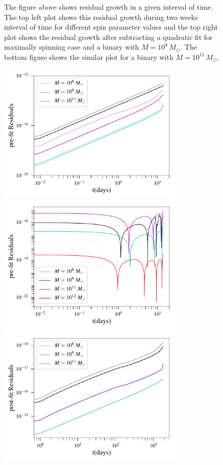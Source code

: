 \documentclass[twocolumn,showpacs,aps,prd,nobibnotes,floatfix]{revtex4-1}
\begin{document}
\begin{widetext}
\begin{figure}
	\caption{The figure above shows residual growth in a given interval of time. The top left plot shows this residual growth during two weeks interval of time for different spin parameter values and the top right plot shows the residual growth after subtracting a quadratic fit for maximally spinning case and a binary with $M = 10^{8}\, M_{\odot}$. The bottom figure shows the similar plot for a binary with $M = 10^{11}\, M_{\odot}$.}
	\label{fig:resedualG}
\end{figure} 

\begin{figure}
	\includegraphics[width=3.5in]{../plots/PlotfromMathematicaData/ResidualGrowth2weeksDiffSpinsInDaysPreFit.pdf}
	\includegraphics[width=3.5in]{../plots/PlotfromMathematicaData/ResidualGrowth2weeksDiffSpinsInDaysPostfit.pdf}
	\includegraphics[width=3.5in]{../plots/PlotfromMathematicaData/ResidualGrowth5YearsDiffSpinsInDaysPrefit.pdf}

\end{figure}
\end{widetext}
\end{document}
